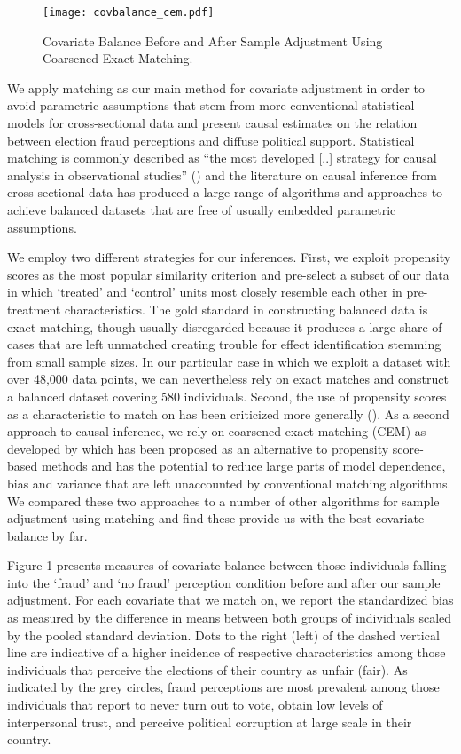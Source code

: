 \documentclass[11pt, ngerman,english,a4]{article}
\begin{document}
\begin{figure}[H]
	\caption{Covariate Balance Before and After Sample Adjustment Using Coarsened Exact Matching.}
	\centering
	\texttt{[image: covbalance\_cem.pdf]}
	\label{fig:balance}
\end{figure}

We apply matching as our main method for covariate adjustment in order to avoid parametric assumptions that stem from more conventional statistical models for cross-sectional data and present causal estimates on the relation between election fraud perceptions and diffuse political support. Statistical matching is commonly described as “the most developed [..] strategy for causal analysis in observational studies” (\citealt{Pearl2010}) and the literature on causal inference from cross-sectional data has produced a large range of algorithms and approaches to achieve balanced datasets that are free of usually embedded  parametric assumptions. 

We employ two different strategies for our inferences. First, we exploit propensity scores as the most popular similarity criterion and pre-select a subset of our data in which `treated' and `control' units most closely resemble each other in pre-treatment characteristics. The gold standard in constructing balanced data is exact matching, though usually disregarded because it produces a large share of cases that are left unmatched creating trouble for effect identification stemming from small sample sizes. In our particular case in which we exploit a dataset with over 48,000 data points, we can nevertheless rely on exact matches and construct a balanced dataset covering 580 individuals. Second, the use of propensity scores as a characteristic to match on has been criticized more generally (\citealt{King2019}). As a second approach to causal inference, we rely on coarsened exact matching (CEM) as developed by \citet{Iacus2012} which has been proposed as an alternative to propensity score-based methods and has the potential to reduce large parts of model dependence, bias and variance that are left unaccounted by conventional matching algorithms. We compared these two approaches to a number of other algorithms for sample adjustment using matching and find these provide us with the best covariate balance by far. 

Figure 1 presents measures of covariate balance between those individuals falling into the `fraud' and `no fraud' perception condition before and after our sample adjustment. For each covariate that we match on, we report the standardized bias as measured by the difference in means between both groups of individuals scaled by the pooled standard deviation. Dots to the right (left) of the dashed vertical line are indicative of a higher incidence of respective characteristics among those individuals that perceive the elections of their country as unfair (fair). As indicated by the grey circles, fraud perceptions are most prevalent among those individuals that report to never turn out to vote, obtain low levels of interpersonal trust, and perceive political corruption at large scale in their country. 
\end{document}
